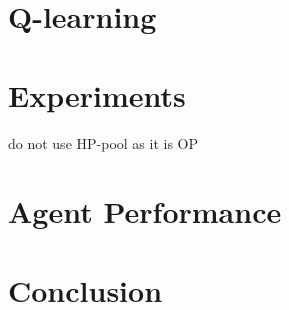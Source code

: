 \section{Q-learning}

\section{Experiments}
do not use HP-pool as it is OP

\section{Agent Performance}

\section{Conclusion}